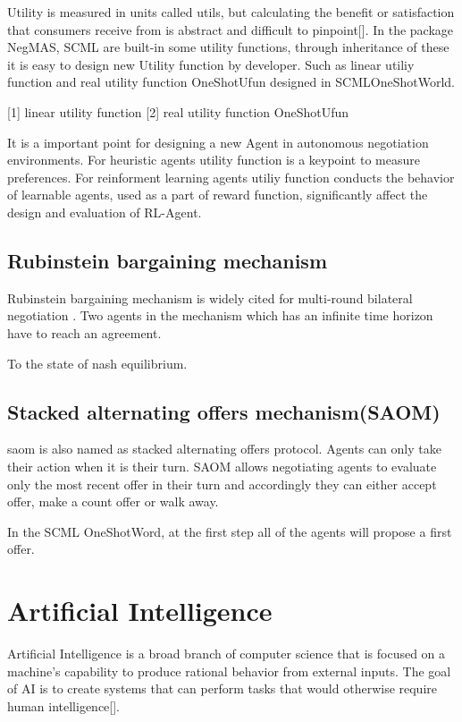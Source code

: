 Utility is measured in units called utils, but calculating the benefit or satisfaction that consumers receive from is abstract and difficult to pinpoint[]. In the package NegMAS, SCML are built-in some utility functions, through inheritance of these it is easy to design new Utility function by developer. Such as linear utiliy function and real utility function OneShotUfun designed in SCMLOneShotWorld.

[1] linear utility function
[2] real utility function OneShotUfun

It is a important point for designing a new Agent in autonomous negotiation environments. For heuristic agents utility function is a keypoint to measure preferences. For reinforment learning agents utiliy function conducts the behavior of learnable agents, used as a part of reward function, significantly affect the design and evaluation of RL-Agent.

\subsection{Rubinstein bargaining mechanism}
Rubinstein bargaining mechanism is widely cited for multi-round bilateral negotiation \parencite{Rubinstein1982}.
Two agents in the mechanism which has an infinite time horizon have to reach an agreement. 

To the state of nash equilibrium.

\subsection{Stacked alternating offers mechanism(SAOM)} \label{background:saom}
\gls{saom} is also named as stacked alternating offers protocol. Agents can only take their action when it is their turn. SAOM allows negotiating agents to evaluate only the most recent offer in their turn and accordingly they can either accept offer, make a count offer or walk away.

In the SCML OneShotWord, at the first step all of the agents will propose a first offer.

\section{Artificial Intelligence}
Artificial Intelligence is a broad branch of computer science that is focused on a machine’s capability to produce rational behavior from external inputs. The goal of AI is to create systems that can perform tasks that would otherwise require human intelligence[].

